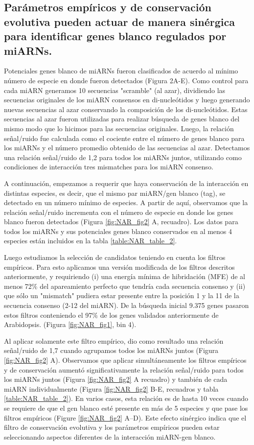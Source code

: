 \subsection{Parámetros empíricos y de conservación evolutiva pueden actuar de manera sinérgica para identificar genes blanco regulados por miARNs.}
Potenciales genes blanco de miARNs fueron clasificados de acuerdo al mínimo número de especie en donde fueron detectados (Figura 2A-E).
Como control para cada miARN generamos 10 secuencias "scramble" (al azar), dividiendo las secuencias originales de los miARN consensos en di-nucleótidos y luego generando nuevas secuencias al azar conservando la composición de los di-nucleótidos.
Estas secuencias al azar fueron utilizadas para realizar búsqueda de genes blanco del mismo modo que lo hicimos para las secuencias originales.
Luego, la relación señal/ruido fue calculada como el cociente entre el número de genes blanco para los miARNs y el número promedio obtenido de las secuencias al azar.
Detectamos una relación señal/ruido de 1,2 para todos los miARNs juntos, utilizando como condiciones de interacción tres mismatches para los miARN consenso. 

A continuación, empezamos a requerir que haya conservación de la interacción en distintas especies, es decir, que el mismo par miARN/gen blanco (tag), se detectado en un número mínimo de especies.
A partir de aquí, observamos que la relación señal/ruido incrementa con el número de especie en donde los genes blanco fueron detectados (Figura \ref{fig:NAR_fig2} A, recuadro).
Los datos para todos los miARNs y sus potenciales genes blanco conservados en al menos 4 especies están incluidos en la tabla \ref{table:NAR_table_2}.

Luego estudiamos la selección de candidatos teniendo en cuenta los filtros empíricos.
Para esto aplicamos una versión modificada de los filtros descritos anteriormente, y requiriendo (i) una energía mínima de hibridación (MFE) de al menos 72\% del apareamiento perfecto que tendría cada secuencia consenso y (ii)  que sólo un "mismatch" pudiera estar presente entre la posición 1 y la 11 de la secuencia consenso (2-12 del miARN).
De la búsqueda inicial 9.375 genes pasaron estos filtros conteniendo el 97\% de los genes validados anteriormente de Arabidopsis. (Figura \ref{fig:NAR_fig1}, bin 4). 

Al aplicar solamente este filtro empírico, dio como resultado una relación señal/ruido de 1,7 cuando agrupamos todos los miARNs juntos (Figura \ref{fig:NAR_fig2} A).
Observamos que aplicar simultáneamente los filtros empíricos y de conservación aumentó significativamente la relación señal/ruido para todos los miARNs juntos (Figura \ref{fig:NAR_fig2} A recuadro) y también de cada miARN individualmente (Figura \ref{fig:NAR_fig2} B-E, recuadros y tabla \ref{table:NAR_table_2}).
En varios casos, esta relación es de hasta 10 veces cuando se requiere de que el gen blanco esté presente en más de 5 especies y que pase los filtros empíricos (Figure \ref{fig:NAR_fig2} A–D).
Este efecto sinérgico indica que el filtro de conservación evolutiva y los parámetros empíricos pueden estar seleccionando aspectos diferentes de la interacción miARN-gen blanco.

